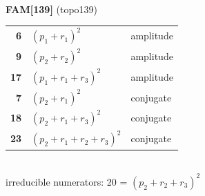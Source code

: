 \documentclass[10pt]{article}
\begin{document}
\begin{minipage}[t]{0.48\textwidth}
{}\\[2mm]\textbf{FAM[139]} (topo139)\\[2pt]{\footnotesize\begin{tabular}{@{}r@{\ \ }l@{\ \ }l@{}}\textbf{6} & $(p_1+r_1)^2$ & amplitude\\
\textbf{9} & $(p_2+r_2)^2$ & amplitude\\
\textbf{17} & $(p_1+r_1+r_3)^2$ & amplitude\\
\textbf{7} & $(p_2+r_1)^2$ & conjugate\\
\textbf{18} & $(p_2+r_1+r_3)^2$ & conjugate\\
\textbf{23} & $(p_2+r_1+r_2+r_3)^2$ & conjugate\\\end{tabular}}\\[2pt]{\scriptsize irreducible numerators: 20 = $(p_2+r_2+r_3)^2$}\end{minipage}

\bigskip
\end{document}
